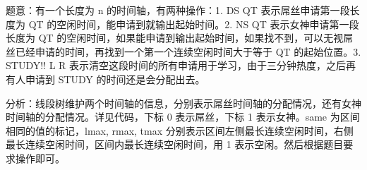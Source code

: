 题意：有一个长度为 n 的时间轴，有两种操作：1. DS QT 表示屌丝申请第一段长度为 QT 的空闲时间，能申请到就输出起始时间。2. NS QT 表示女神申请第一段长度为 QT 的空闲时间，如果能申请到输出起始时间，如果找不到，可以无视屌丝已经申请的时间，再找到一个第一个连续空闲时间大于等于 QT 的起始位置。3. STUDY!! L R 表示清空这段时间的所有申请用于学习，由于三分钟热度，之后再有人申请到 STUDY 的时间还是会分配出去。

分析：线段树维护两个时间轴的信息，分别表示屌丝时间轴的分配情况，还有女神时间轴的分配情况。详见代码，下标 0 表示屌丝，下标 1 表示女神。same 为区间相同的值的标记，lmax, rmax, tmax 分别表示区间左侧最长连续空闲时间，右侧最长连续空闲时间，区间内最长连续空闲时间，用 1 表示空闲。然后根据题目要求操作即可。